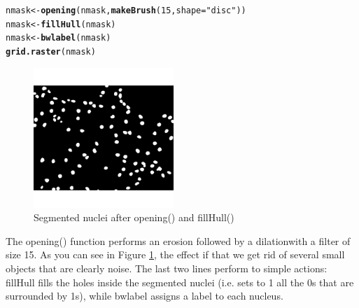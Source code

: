 \documentclass{article}\usepackage[]{graphicx}\usepackage[]{color}
\makeatletter
\newcommand{\hlnum}[1]{\textcolor[rgb]{0.686,0.059,0.569}{#1}}%
\newcommand{\hlstr}[1]{\textcolor[rgb]{0.192,0.494,0.8}{#1}}%
\newcommand{\hlstd}[1]{\textcolor[rgb]{0.345,0.345,0.345}{#1}}%
\newcommand{\hlkwb}[1]{\textcolor[rgb]{0.69,0.353,0.396}{#1}}%
\newcommand{\hlkwc}[1]{\textcolor[rgb]{0.333,0.667,0.333}{#1}}%
\newcommand{\hlkwd}[1]{\textcolor[rgb]{0.737,0.353,0.396}{\textbf{#1}}}%
\newenvironment{kframe}{%
 \def\at@end@of@kframe{}%
 \ifinner\ifhmode%
  \def\at@end@of@kframe{\end{minipage}}%
  \begin{minipage}{\columnwidth}%
 \fi\fi%
 \def\FrameCommand##1{\hskip\@totalleftmargin \hskip-\fboxsep
 \colorbox{shadecolor}{##1}\hskip-\fboxsep
     \hskip-\linewidth \hskip-\@totalleftmargin \hskip\columnwidth}%
 \MakeFramed {\advance\hsize-\width
   \@totalleftmargin\z@ \linewidth\hsize
   \@setminipage}}%
 {\par\unskip\endMakeFramed%
 \at@end@of@kframe}
\newenvironment{knitrout}{}{} %
\makeatother
\begin{document}
\begin{knitrout}
\color{fgcolor}\begin{kframe}
\begin{alltt}
\hlstd{nmask} \hlkwb{<-} \hlkwd{opening}\hlstd{(nmask,} \hlkwd{makeBrush}\hlstd{(}\hlnum{15}\hlstd{,} \hlkwc{shape} \hlstd{=} \hlstr{"disc"}\hlstd{))}
\hlstd{nmask} \hlkwb{<-} \hlkwd{fillHull}\hlstd{(nmask)}
\hlstd{nmask} \hlkwb{<-} \hlkwd{bwlabel}\hlstd{(nmask)}
\hlkwd{grid.raster}\hlstd{(nmask)}
\end{alltt}
\end{kframe}\begin{figure}[]


{\centering \includegraphics[width=200px]{knit_figure/figopening} 

}

\caption[Segmented nuclei after opening() and fillHull()]{Segmented nuclei after opening() and fillHull()\label{fig:opening}}
\end{figure}


\end{knitrout}

The opening() function performs an erosion followed by a dilation\footnotemark[1] with a filter of size 15. As you can see in Figure \ref{fig:opening}, the effect if that we get rid of several small objects that are clearly noise.
The last two lines perform to simple actions: fillHull fills the holes inside the segmented nuclei (i.e. sets to 1 all the 0s that are surrounded by 1s), while bwlabel assigns a label to each nucleus.

\end{document}
